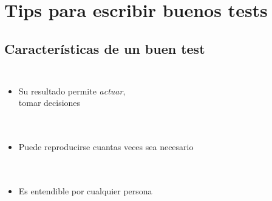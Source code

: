 \section{Tips para escribir buenos tests}

%
\subsection{Características de un buen test}

  \begin{frame}{\insertsubsection}
    \begin{columns}
      \begin{itemize}
        \item<1->Su resultado permite \alert{\emph{actuar}},\\
        tomar decisiones\\~\\~\\
        \item<2->Puede reproducirse cuantas veces sea necesario\\~\\~\\
        \item<3->Es entendible por cualquier persona
      \end{itemize}
    \end{columns}
  \end{frame}



